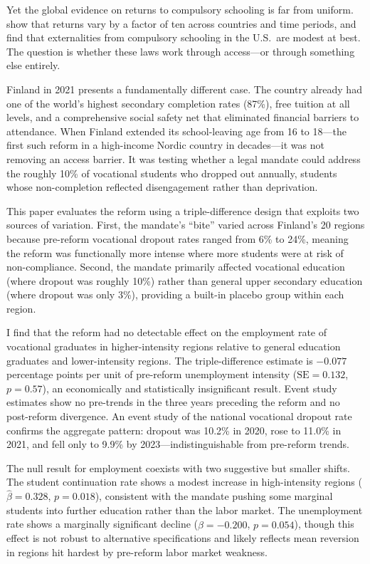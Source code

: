 \documentclass[12pt]{article}
\begin{document}
Yet the global evidence on returns to compulsory schooling is far from uniform. \citet{Psacharopoulos2018} show that returns vary by a factor of ten across countries and time periods, and \citet{AcemogluAngrist2000} find that externalities from compulsory schooling in the U.S.\ are modest at best. The question is whether these laws work through access---or through something else entirely.

Finland in 2021 presents a fundamentally different case. The country already had one of the world's highest secondary completion rates (87\%), free tuition at all levels, and a comprehensive social safety net that eliminated financial barriers to attendance. When Finland extended its school-leaving age from 16 to 18---the first such reform in a high-income Nordic country in decades---it was not removing an access barrier. It was testing whether a legal mandate could address the roughly 10\% of vocational students who dropped out annually, students whose non-completion reflected disengagement rather than deprivation.

This paper evaluates the reform using a triple-difference design that exploits two sources of variation. First, the mandate's ``bite'' varied across Finland's 20 regions because pre-reform vocational dropout rates ranged from 6\% to 24\%, meaning the reform was functionally more intense where more students were at risk of non-compliance. Second, the mandate primarily affected vocational education (where dropout was roughly 10\%) rather than general upper secondary education (where dropout was only 3\%), providing a built-in placebo group within each region.

I find that the reform had no detectable effect on the employment rate of vocational graduates in higher-intensity regions relative to general education graduates and lower-intensity regions. The triple-difference estimate is $-0.077$ percentage points per unit of pre-reform unemployment intensity ($\text{SE} = 0.132$, $p = 0.57$), an economically and statistically insignificant result. Event study estimates show no pre-trends in the three years preceding the reform and no post-reform divergence. An event study of the national vocational dropout rate confirms the aggregate pattern: dropout was 10.2\% in 2020, rose to 11.0\% in 2021, and fell only to 9.9\% by 2023---indistinguishable from pre-reform trends.

The null result for employment coexists with two suggestive but smaller shifts. The student continuation rate shows a modest increase in high-intensity regions ($\hat{\beta} = 0.328$, $p = 0.018$), consistent with the mandate pushing some marginal students into further education rather than the labor market. The unemployment rate shows a marginally significant decline ($\hat{\beta} = -0.200$, $p = 0.054$), though this effect is not robust to alternative specifications and likely reflects mean reversion in regions hit hardest by pre-reform labor market weakness.
\end{document}
